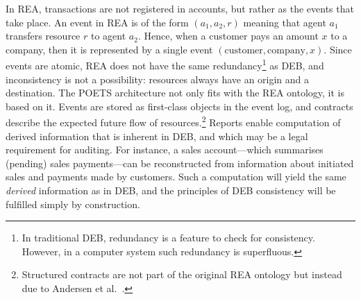 In REA, transactions are not registered in accounts, but rather as the
events that take place. An event in REA is of the form $(a_1,a_2,r)$
meaning that agent $a_1$ transfers resource $r$ to agent $a_2$. Hence,
when a customer pays an amount $x$ to a company, then it is
represented by a single event
$(\mbox{customer},\mbox{company},x)$. Since events are atomic, REA
does not have the same redundancy\footnote{In traditional DEB,
  redundancy is a feature to check for consistency. However,
  in a computer system such redundancy is superfluous.} as DEB, and
inconsistency is not a possibility: resources always have an origin and a
destination.  The POETS architecture not only fits with the REA
ontology, it is based on it. Events are stored as first-class objects
in the event log, and contracts describe the expected future flow of
resources.\footnote{Structured contracts are not part of the original
  REA ontology but instead due to Andersen et
  al.~\cite{andersen06sttt}.} Reports enable computation of derived 
information that is inherent in DEB, and which may be a legal
requirement for auditing. For instance, a sales account---which
summarises (pending) sales payments---can be reconstructed from
information about initiated sales and payments made by customers. Such
a computation will yield the same \emph{derived} information as in
DEB, and the principles of DEB consistency will be fulfilled simply by
construction.

